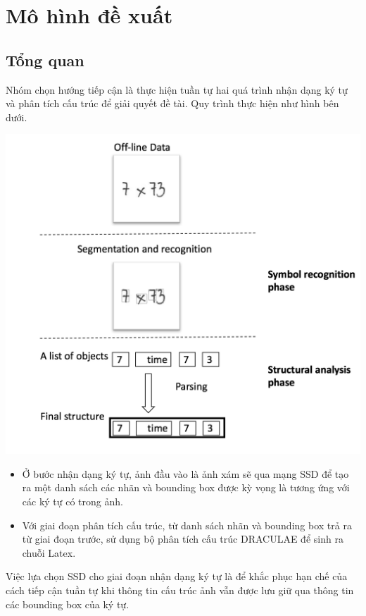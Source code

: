 \documentclass[a4paper]{article}
\theoremstyle{definition}
\begin{document}
	
	\newpage
	\section{Mô hình đề xuất}
	\label{sec: mohinhdexuat}
	\subsection{Tổng quan}
	Nhóm chọn hướng tiếp cận là thực hiện tuần tự hai quá trình nhận dạng ký tự và phân tích cấu trúc để giải quyết đề tài. Quy trình thực hiện như hình bên dưới.
	\begin{center}
		
		\centering
		\includegraphics[width=0.8\linewidth]{overview}
		\vspace{0.5cm}
	\end{center}
	\begin{itemize}
		\item Ở bước nhận dạng ký tự, ảnh đầu vào là ảnh xám sẽ qua mạng SSD\cite{liu2016ssd} để tạo ra một danh sách các nhãn và bounding box được kỳ vọng là tương ứng với các ký tự có trong ảnh.
		\item Với giai đoạn phân tích cấu trúc, từ danh sách nhãn và bounding box trả ra từ giai đoạn trước, sử dụng bộ phân tích cấu trúc DRACULAE \cite{zanibbi} để sinh ra chuỗi Latex.
	\end{itemize}
	Việc lựa chọn SSD cho giai đoạn nhận dạng ký tự là để khắc phục hạn chế của cách tiếp cận tuần tự khi thông tin cấu trúc ảnh vẫn được lưu giữ qua thông tin các bounding box của ký tự. 
\end{document}
